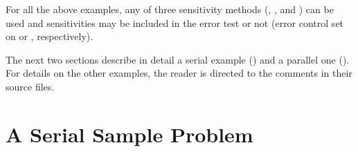 For all the above examples, any of three sensitivity methods (, 
, and ) can be used and sensitivities may be 
included in the error test or not (error control set on  or ,
respectively).

The next two sections describe in detail a serial example () and
a parallel one (). For details on the other examples, the reader is
directed to the comments in their source files.

\section{A Serial Sample Problem}\label{ss:serial_fwd_ex}

